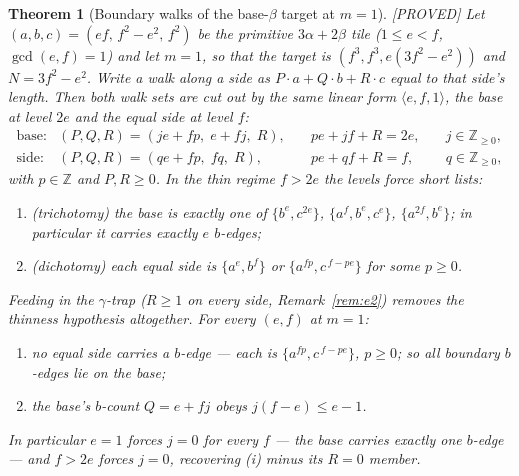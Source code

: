 \documentclass[11pt,reqno]{amsart}
\theoremstyle{plain}
\newtheorem{theorem}{Theorem}
\theoremstyle{definition}
\newcommand{\lab}[1]{\hfill\textnormal{\footnotesize\textsc{[#1]}}}
\begin{document}
\begin{theorem}[Boundary walks of the base-$\beta$ target at $m=1$]\label{thm:walks}\lab{PROVED}
Let $(a,b,c)=(ef,\,f^2-e^2,\,f^2)$ be the primitive $3\alpha+2\beta$ tile ($1\le e<f$,
$\gcd(e,f)=1$) and let $m=1$, so that the target is $(f^3,f^3,e(3f^2-e^2))$ and $N=3f^2-e^2$. Write a
walk along a side as $P\cdot a+Q\cdot b+R\cdot c$ equal to that side's length. Then both walk sets are
cut out by the \emph{same} linear form $\langle e,f,1\rangle$, the base at level $2e$ and the equal
side at level $f$:
\[
\begin{array}{llll}
\text{base:} & (P,Q,R)=(je+fp,\;e+fj,\;R), &\quad pe+jf+R=2e, &\quad j\in\mathbb{Z}_{\ge0},\\[2pt]
\text{side:} & (P,Q,R)=(qe+fp,\;fq,\;R), &\quad pe+qf+R=f,  &\quad q\in\mathbb{Z}_{\ge0},
\end{array}
\]
with $p\in\mathbb{Z}$ and $P,R\ge0$. In the thin regime $f>2e$ the levels force short lists:
\begin{enumerate}
\item[\textup{(i)}] \textup{(trichotomy)} the base is exactly one of
$\{b^{e},c^{2e}\}$, $\{a^{f},b^{e},c^{e}\}$, $\{a^{2f},b^{e}\}$; in particular it carries
\emph{exactly $e$} $b$-edges;
\item[\textup{(ii)}] \textup{(dichotomy)} each equal side is $\{a^{e},b^{f}\}$ or
$\{a^{fp},c^{\,f-pe}\}$ for some $p\ge0$.
\end{enumerate}
Feeding in the $\gamma$-trap ($R\ge1$ on every side, Remark~\ref{rem:e2}) removes the thinness
hypothesis altogether. For \emph{every} $(e,f)$ at $m=1$:
\begin{enumerate}
\item[\textup{(iii)}] \emph{no equal side carries a $b$-edge} --- each is $\{a^{fp},c^{\,f-pe}\}$,
$p\ge0$; so \emph{all} boundary $b$-edges lie on the base;
\item[\textup{(iv)}] the base's $b$-count $Q=e+fj$ obeys $j(f-e)\le e-1$.
\end{enumerate}
In particular $e=1$ forces $j=0$ for every $f$ --- \emph{the base carries exactly one $b$-edge} --- and
$f>2e$ forces $j=0$, recovering \textup{(i)} minus its $R=0$ member.
\end{theorem}
\end{document}

